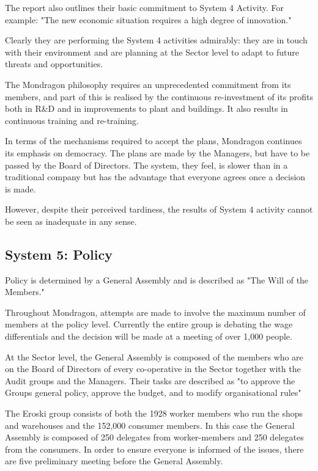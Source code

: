 The report also outlines their basic commitment to System 4 Activity. For example: "The new economic situation requires a high degree of innovation."

Clearly they are performing the System 4 activities admirably: they are in touch with their environment and are planning at the Sector level to adapt to future threats and opportunities.

The Mondragon philosophy requires an unprecedented commitment from its members, and part of this is realised by the continuous re-investment of its profits both in R\&D and in improvements to plant and buildings. It also results in continuous training and re-training.

In terms of the mechanisms required to accept the plans, Mondragon continues its emphasis on democracy. The plans are made by the Managers, but have to be passed by the Board of Directors. The system, they feel, is slower than in a traditional company but has the advantage that everyone agrees once a decision is made.

However, despite their perceived tardiness, the results of System 4 activity cannot be seen as inadequate in any sense.

\subsection*{System 5: Policy}
Policy is determined by a General Assembly and is described as "The Will of the Members."

Throughout Mondragon, attempts are made to involve the maximum number of members at the policy level. Currently the entire group is debating the wage differentials and the decision will be made at a meeting of over 1,000 people.

At the Sector level, the General Assembly is composed of the members who are on the Board of Directors of every co-operative in the Sector together with the Audit groups and the Managers. Their tasks are described as "to approve the Groups general policy, approve the budget, and to modify organisational rules"

The Eroski group consists of both the 1928 worker members who run the shops and warehouses and the 152,000 consumer members. In this case the General Assembly is composed of 250 delegates from worker-members and 250 delegates from the consumers. In order to ensure everyone is informed of the issues, there are five preliminary meeting before the General Assembly.


